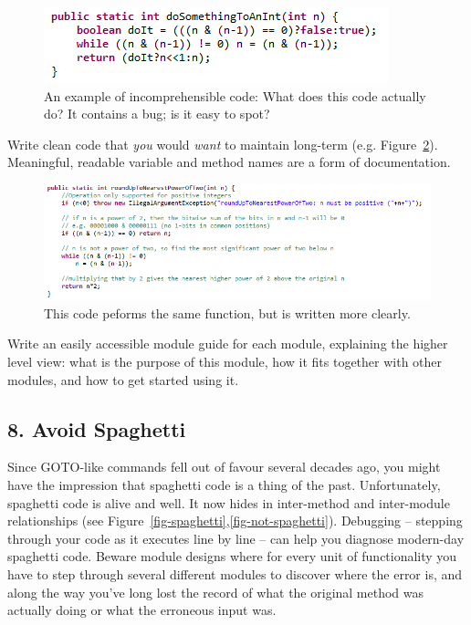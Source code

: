 \documentclass{bmcart}
\begin{document}
\begin{figure}%
\includegraphics[width=\columnwidth]{code-snippet.png}%
\caption{An example of incomprehensible code: What does this code actually do? It contains a bug; is it easy to spot?}%
\label{fig-incomprehensible}%
\end{figure}

Write clean code \cite{cleancode} that \textit{you} would \textit{want} to maintain long-term (e.g. Figure~\ref{fig-comprehensible}). Meaningful, readable variable and method names are a form of documentation. 

\begin{figure}%
\includegraphics[width=\columnwidth]{code-snippet-fixed.png}%
\caption{This code peforms the same function, but is written more clearly.}%
\label{fig-comprehensible}%
\end{figure}

Write an easily accessible module guide for each module, explaining the higher level view: what is the purpose of this module, how it fits together with other modules, and how to get started using it. 

\subsection*{8. Avoid Spaghetti}

Since GOTO-like commands fell out of favour several decades ago, you might have the impression that spaghetti code is a thing of the past. Unfortunately, spaghetti code is alive and well. It now hides in inter-method and inter-module relationships (see Figure~\ref{fig-spaghetti},\ref{fig-not-spaghetti}). Debugging -- stepping through your code as it executes line by line -- can help you diagnose modern-day spaghetti code. Beware module designs where for every unit of functionality you have to step through several different modules to discover where the error is, and along the way you've long lost the record of what the original method was actually doing or what the erroneous input was. 
\end{document}
